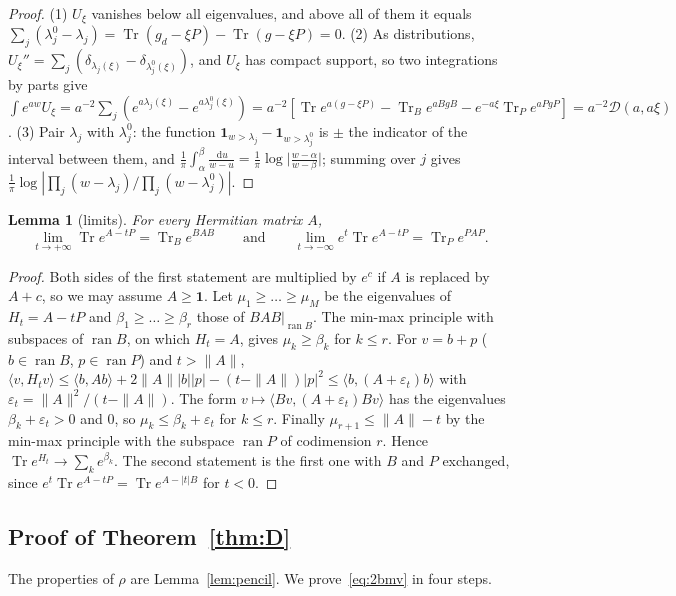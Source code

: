 \documentclass[11pt]{amsart}
\newtheorem{lemma}[theorem]{Lemma}
\theoremstyle{definition}
\theoremstyle{remark}
\numberwithin{equation}{section}
\newcommand{\Tr}{\operatorname{Tr}}
\newcommand{\one}{\mathbf{1}}
\newcommand{\ip}[2]{\langle #1,#2\rangle}
\newcommand{\cD}{\mathcal{D}}
\newcommand{\dd}{\,\mathrm{d}}
\begin{document}
\begin{proof}
(1) $U_\xi$ vanishes below all eigenvalues, and above all of them it equals
$\sum_j(\lambda^0_j-\lambda_j)=\Tr(g_d-\xi P)-\Tr(g-\xi P)=0$. (2) As distributions,
$U_\xi''=\sum_j(\delta_{\lambda_j(\xi)}-\delta_{\lambda^0_j(\xi)})$, and $U_\xi$ has compact support, so two integrations by
parts give $\int e^{aw}U_\xi=a^{-2}\sum_j(e^{a\lambda_j(\xi)}-e^{a\lambda^0_j(\xi)})
=a^{-2}[\Tr e^{a(g-\xi P)}-\Tr_Be^{aBgB}-e^{-a\xi}\Tr_Pe^{aPgP}]=a^{-2}\cD(a,a\xi)$. (3) Pair $\lambda_j$ with $\lambda^0_j$: the
function $\one_{w>\lambda_j}-\one_{w>\lambda^0_j}$ is $\pm$ the indicator of the interval between them, and
$\frac1\pi\int_\alpha^\beta\frac{\dd u}{w-u}=\frac1\pi\log\bigl|\frac{w-\alpha}{w-\beta}\bigr|$; summing over $j$ gives
$\frac1\pi\log|\prod_j(w-\lambda_j)/\prod_j(w-\lambda^0_j)|$.
\end{proof}

\begin{lemma}[limits]\label{lem:limits}
For every Hermitian matrix $A$,
\[
\lim_{t\to+\infty}\Tr e^{A-tP}=\Tr_Be^{BAB}\qquad\text{and}\qquad\lim_{t\to-\infty}e^t\Tr e^{A-tP}=\Tr_Pe^{PAP}.
\]
\end{lemma}

\begin{proof}
Both sides of the first statement are multiplied by $e^c$ if $A$ is replaced by $A+c$, so we may assume $A\ge\one$. Let
$\mu_1\ge\dots\ge\mu_M$ be the eigenvalues of $H_t=A-tP$ and $\beta_1\ge\dots\ge\beta_r$ those of $BAB|_{\operatorname{ran}B}$.
The min-max principle with subspaces of $\operatorname{ran}B$, on which $H_t=A$, gives $\mu_k\ge\beta_k$ for $k\le r$. For
$v=b+p$ ($b\in\operatorname{ran}B$, $p\in\operatorname{ran}P$) and $t>\|A\|$,
$\ip v{H_tv}\le\ip b{Ab}+2\|A\||b||p|-(t-\|A\|)|p|^2\le\ip b{(A+\varepsilon_t)b}$ with
$\varepsilon_t=\|A\|^2/(t-\|A\|)$. The form $v\mapsto\ip{Bv}{(A+\varepsilon_t)Bv}$ has the eigenvalues
$\beta_k+\varepsilon_t>0$ and $0$, so $\mu_k\le\beta_k+\varepsilon_t$ for $k\le r$. Finally $\mu_{r+1}\le\|A\|-t$ by the min-max
principle with the subspace $\operatorname{ran}P$ of codimension $r$. Hence $\Tr e^{H_t}\to\sum_ke^{\beta_k}$. The second
statement is the first one with $B$ and $P$ exchanged, since $e^t\Tr e^{A-tP}=\Tr e^{A-|t|B}$ for $t<0$.
\end{proof}

\subsection{Proof of Theorem~\ref{thm:D}}\label{subsec:proofD}
The properties of $\rho$ are Lemma~\ref{lem:pencil}. We prove~\eqref{eq:2bmv} in four steps.
\end{document}
